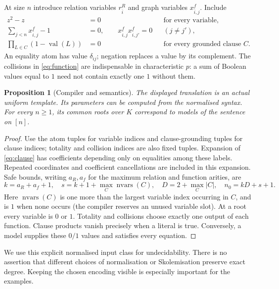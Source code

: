 \documentclass[11pt,a4paper]{article}
\newtheorem{proposition}[theorem]{Proposition}
\theoremstyle{definition}\newtheorem{definition}[theorem]{Definition}
\theoremstyle{remark}\newtheorem{remark}[theorem]{Remark}
\begin{document}
At size $n$ introduce relation variables $r^R_{\bar i}$ and graph variables $x^f_{\bar i,j}$. Include
\begin{align}
 z^2-z&=0 &&\text{for every variable},\label{eq:boolean}\\
 \sum_{j<n}x^f_{\bar i,j}-1&=0,\qquad
 x^f_{\bar i,j}x^f_{\bar i,j'}=0 &&(j\ne j'),\label{eq:function}\\
 \prod_{L\in C}(1-\operatorname{val}(L))&=0 &&\text{for every grounded clause }C.\label{eq:clause}
\end{align}
An equality atom has value $\delta_{ij}$; negation replaces a value by its complement. The collisions in \eqref{eq:function} are indispensable in characteristic $p$: a sum of Boolean values equal to $1$ need not contain exactly one $1$ without them.

\begin{proposition}[Compiler and semantics]\label{prop:compiler}
The displayed translation is an actual uniform template. Its parameters can be computed from the normalised syntax. For every $n\ge1$, its common roots over $K$ correspond to models of the sentence on $[n]$.
\end{proposition}
\begin{proof}
Use the atom tuples for variable indices and clause-grounding tuples for clause indices; totality and collision indices are also fixed tuples. Expansion of \eqref{eq:clause} has coefficients depending only on equalities among these labels. Repeated coordinates and coefficient cancellations are included in this expansion. Safe bounds, writing $a_R,a_f$ for the maximum relation and function arities, are
\[
 k=a_R+a_f+1,\quad s=k+1+\max_C\operatorname{nvars}(C),\quad
 D=2+\max_C|C|,\quad n_0=kD+s+1.
\]
Here $\operatorname{nvars}(C)$ is one more than the largest variable index
occurring in $C$, and is $1$ when none occurs (the compiler reserves an unused variable slot). At a root every variable is $0$ or $1$. Totality and collisions choose exactly one output of each function. Clause products vanish precisely when a literal is true. Conversely, a model supplies these $0/1$ values and satisfies every equation.
\end{proof}

We use this explicit normalised input class for undecidability. There is no assertion that different choices of normalisation or Skolemisation preserve exact degree. Keeping the chosen encoding visible is especially important for the examples.
\end{document}
